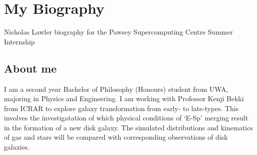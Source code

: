 \section{My Biography}
Nicholas Lawler biography for the Pawsey Supercomputing Centre Summer Internship
\subsection{About me}
I am a second year Bachelor of Philosophy (Honours) student from UWA, majoring in Physics and Engineering. I am working with Professor Kenji Bekki from ICRAR to explore galaxy transformation from early- to late-types. This involves the investigatation of which physical conditions of `E-Sp’ merging result in the formation of a new disk galaxy. The simulated distributions and kinematics of gas and stars will be compared with corresponding observations of disk galaxies.
